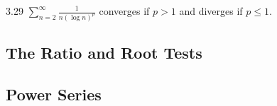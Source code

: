 \begin{theorem}{}{3.29}
    $\sum_{n=2}^\infty \frac{1}{n(\log n)^p}$ converges if $p > 1$ and diverges if $p \leq 1$.
\end{theorem}


\subsection{The Ratio and Root Tests}
\subsection{Power Series}

